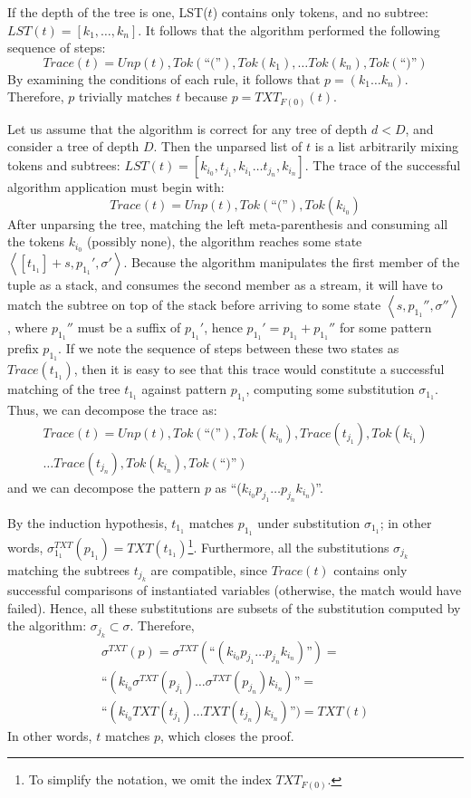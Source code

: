 \documentclass{sigplanconf}
\begin{document}
If the depth of the tree is one, LST($t$) contains only tokens, and no
subtree: $LST(t)=[k_1, \dots, k_n]$. It follows that the algorithm
performed the following sequence of steps:
\[ Trace(t) = Unp(t), Tok(\mbox{``(''}), Tok(k_1),\dots 
   Tok(k_n), Tok(\mbox{``)''}) \]
By examining the conditions of each rule, it follows that $p=(k_1\dots
k_n)$. Therefore, $p$ trivially matches $t$ because $p=TXT_{F(0)}(t)$.

Let us assume that the algorithm is correct for any tree of depth
$d<D$, and consider a tree of depth $D$. Then the unparsed list of
$t$ is a list arbitrarily mixing tokens and subtrees: $LST(t) =
[k_{i_0}, t_{j_1}, k_{i_1} \dots t_{j_n}, k_{i_n}]$. The trace of the
successful algorithm application must begin with:
\[
Trace(t) = Unp(t), Tok(\mbox{``(''}), Tok(k_{i_0})
\]
After unparsing the tree, matching the left meta-parenthesis and
consuming all the tokens $k_{i_0}$ (possibly none), the algorithm
reaches some state $\left<[t_{1_1}]+s, p_{1_1}',
\sigma'\right>$. Because the algorithm manipulates the first member of
the tuple as a stack, and consumes the second member as a stream, it
will have to match the subtree on top of the stack before arriving to
some state $\left<s, p_{1_1}'', \sigma''\right>$, where $p_{1_1}''$
must be a suffix of $p_{1_1}'$, hence $p_{1_1}'=p_{1_1}+p_{1_1}''$ for
some pattern prefix $p_{1_1}$. If we note the sequence of steps
between these two states as $Trace(t_{1_1})$, then it is easy to see
that this trace would constitute a successful matching of the tree
$t_{1_1}$ against pattern $p_{1_1}$, computing some substitution
$\sigma_{1_1}$. Thus, we can decompose the trace as:
\begin{eqnarray*}
Trace(t) = Unp(t), Tok(\mbox{``(''}), Tok(k_{i_0}), Trace(t_{j_1}), 
 Tok(k_{i_1})\\
 \dots Trace(t_{j_n}), Tok(k_{i_n}), Tok(\mbox{``)''})
\end{eqnarray*}
and we can decompose the pattern $p$ as ``($k_{i_0} p_{j_1}\dots
p_{j_n} k_{i_n}$)''.

By the induction hypothesis, $t_{1_1}$ matches $p_{1_1}$ under
substitution $\sigma_{1_1}$; in other words,
$\sigma^{TXT}_{1_1}(p_{1_1})=TXT(t_{1_1})$\footnote{To simplify the
notation, we omit the index $TXT_{F(0)}$.}. Furthermore, all the
substitutions $\sigma_{j_k}$ matching the subtrees $t_{j_k}$ are
compatible, since $Trace(t)$ contains only successful comparisons of
instantiated variables (otherwise, the match would have
failed). Hence, all these substitutions are subsets of the
substitution computed by the algorithm: $\sigma_{j_k}\subset
\sigma$. Therefore,
\begin{eqnarray*}
\sigma^{TXT}(p) = \sigma^{TXT}(\mbox{``}(k_{i_0} p_{j_1}\dots p_{j_n}
k_{i_n})\mbox{''}) = \\
\mbox{``}(k_{i_0} \sigma^{TXT}(p_{j_1})\dots
\sigma^{TXT}(p_{j_n}) k_{i_n})\mbox{''} = \\
\mbox{``}(k_{i_0} TXT(t_{j_1})\dots TXT(t_{j_n}) k_{i_n})\mbox{''}) = TXT(t)
\end{eqnarray*}
In other words, $t$ matches $p$, which closes the proof.
\end{document}
